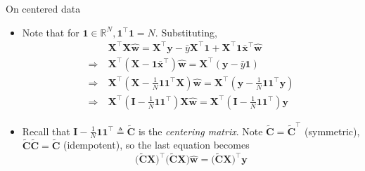 \documentclass{beamer}
\numberwithin{equation}{section}
\begin{document}
\begin{frame}{On centered data}
    \begin{itemize}
        \item
        Note that for $ \mathbf{1} \in \mathbb{R}^N,
        \mathbf{1}^\top\mathbf{1} = N $. Substituting,
        \begin{equation*}
            \begin{split}
	            & \mathbf{X}^\top\mathbf{X}\hat{\mathbf{w}} =
	            \mathbf{X}^\top\mathbf{y} - \bar{y}\mathbf{X}^\top\mathbf{1} +
	            \mathbf{X}^\top\mathbf{1}\bar{\mathbf{x}}^\top\hat{\mathbf{w}} \\
	            \Rightarrow \ & \mathbf{X}^\top
	            (\mathbf{X} - \mathbf{1}\bar{\mathbf{x}}^\top)\hat{\mathbf{w}} =
	            \mathbf{X}^\top(\mathbf{y} - \bar{y}\mathbf{1}) \\
	            \Rightarrow \ & \mathbf{X}^\top\left(
	                \mathbf{X} - \frac{1}{N}\mathbf{11}^\top\mathbf{X}
	            \right)\hat{\mathbf{w}} = \mathbf{X}^\top\left(
	                \mathbf{y} - \frac{1}{N}\mathbf{11}^\top\mathbf{y}
	            \right) \\
	            \Rightarrow \ & \mathbf{X}^\top\left(
	                \mathbf{I} - \frac{1}{N}\mathbf{11}^\top
	            \right)\mathbf{X}\hat{\mathbf{w}} = \mathbf{X}^\top\left(
	                \mathbf{I} - \frac{1}{N}\mathbf{11}^\top
	            \right)\mathbf{y}
            \end{split}
        \end{equation*}

        \item
        Recall that $ \mathbf{I} - \frac{1}{N}\mathbf{11}^\top \triangleq
        \tilde{\mathbf{C}} $ is the \textit{centering matrix}. Note
        $ \tilde{\mathbf{C}} = \tilde{\mathbf{C}}^\top $ (symmetric),
        $ \tilde{\mathbf{C}}\tilde{\mathbf{C}} = \tilde{\mathbf{C}} $
        (idempotent), so the last equation becomes
        \begin{equation*}
            \big(\tilde{\mathbf{C}}\mathbf{X}\big)^\top\big(
                \tilde{\mathbf{C}}\mathbf{X}
            \big)\hat{\mathbf{w}} =
            \big(\tilde{\mathbf{C}}\mathbf{X}\big)^\top\mathbf{y}
        \end{equation*}
    \end{itemize}
\end{frame}
\end{document}
